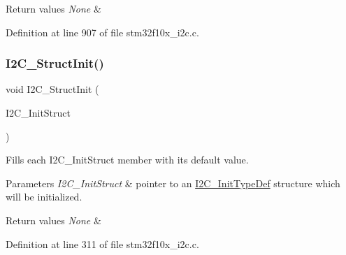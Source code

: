 \begin{DoxyRetVals}{Return values}
{\em None} & \\
\hline
\end{DoxyRetVals}


Definition at line 907 of file stm32f10x\+\_\+i2c.\+c.

\mbox{\label{group___i2_c___exported___functions_ga08582aca6d7d7910cd5cbff0d9def350}} 
\subsubsection{\texorpdfstring{I2\+C\+\_\+\+Struct\+Init()}{I2C\_StructInit()}}
{\footnotesize\ttfamily void I2\+C\+\_\+\+Struct\+Init (\begin{DoxyParamCaption}\item[{\hyperlink{struct_i2_c___init_type_def}{I2\+C\+\_\+\+Init\+Type\+Def} $\ast$}]{I2\+C\+\_\+\+Init\+Struct }\end{DoxyParamCaption})}



Fills each I2\+C\+\_\+\+Init\+Struct member with its default value. 


\begin{DoxyParams}{Parameters}
{\em I2\+C\+\_\+\+Init\+Struct} & pointer to an \hyperlink{struct_i2_c___init_type_def}{I2\+C\+\_\+\+Init\+Type\+Def} structure which will be initialized. \\
\hline
\end{DoxyParams}

\begin{DoxyRetVals}{Return values}
{\em None} & \\
\hline
\end{DoxyRetVals}


Definition at line 311 of file stm32f10x\+\_\+i2c.\+c.

\mbox{\label{group___i2_c___exported___functions_gaa27d1440290fe601e730b6980999afe3}} 
